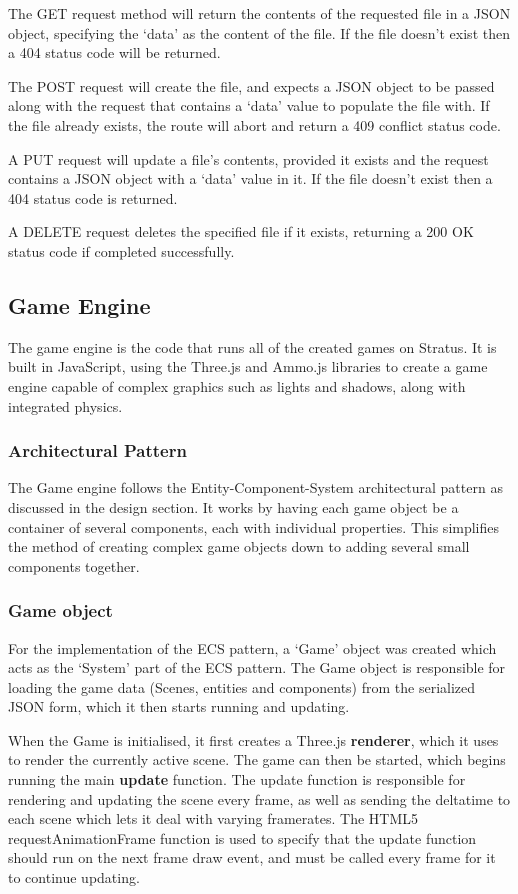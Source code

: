 	The GET request method will return the contents of the requested file in a JSON object, specifying the `data' as the content of the file. If the file doesn't exist then a 404 status code will be returned.

	The POST request will create the file, and expects a JSON object to be passed along with the request that contains a `data' value to populate the file with. If the file already exists, the route will abort and return a 409 conflict status code.

	A PUT request will update a file's contents, provided it exists and the request contains a JSON object with a `data' value in it. If the file doesn't exist then a 404 status code is returned.

	A DELETE request deletes the specified file if it exists, returning a 200 OK status code if completed successfully.

	\subsection{Game Engine}
	The game engine is the code that runs all of the created games on Stratus. It is built in JavaScript, using the Three.js and Ammo.js libraries to create a game engine capable of complex graphics such as lights and shadows, along with integrated physics.

	\subsubsection{Architectural Pattern}
	The Game engine follows the Entity-Component-System architectural pattern as discussed in the design section. It works by having each game object be a container of several components, each with individual properties. This simplifies the method of creating complex game objects down to adding several small components together.

	\subsubsection{Game object}
	For the implementation of the ECS pattern, a `Game' object was created which acts as the `System' part of the ECS pattern. The Game object is responsible for loading the game data (Scenes, entities and components) from the serialized JSON form, which it then starts running and updating. 

	When the Game is initialised, it first creates a Three.js \textbf{renderer}, which it uses to render the currently active scene. The game can then be started, which begins running the main \textbf{update} function. The update function is responsible for rendering and updating the scene every frame, as well as sending the deltatime to each scene which lets it deal with varying framerates. The HTML5 requestAnimationFrame function is used to specify that the update function should run on the next frame draw event, and must be called every frame for it to continue updating.

